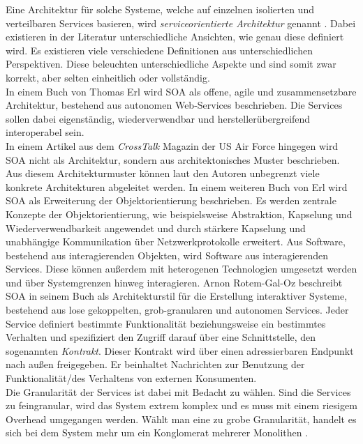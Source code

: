 Eine Architektur für solche Systeme, welche auf einzelnen isolierten und verteilbaren Services basieren, wird \textit{serviceorientierte Architektur} genannt \cite{SANDERS.2008}. Dabei existieren in der Literatur unterschiedliche Ansichten, wie genau diese definiert wird. Es existieren viele verschiedene Definitionen aus unterschiedlichen Perspektiven. Diese beleuchten unterschiedliche Aspekte und sind somit zwar korrekt, aber selten einheitlich oder vollständig.\\ 
In einem Buch von Thomas Erl \cite{ERL.2009} wird SOA als offene, agile und zusammensetzbare Architektur, bestehend aus autonomen Web-Services beschrieben. Die Services sollen dabei eigenständig, wiederverwendbar und herstellerübergreifend interoperabel sein.\\
In einem Artikel aus dem \textit{CrossTalk} Magazin der US Air Force \cite{G.A.LEWIS.2007} hingegen wird SOA nicht als Architektur, sondern aus architektonisches Muster beschrieben. Aus diesem Architekturmuster können laut den Autoren unbegrenzt viele konkrete Architekturen abgeleitet werden.
In einem weiteren Buch von Erl \cite{ERL.2009b} wird SOA als Erweiterung der Objektorientierung beschrieben. Es werden zentrale Konzepte der Objektorientierung, wie beispielsweise Abstraktion, Kapselung und Wiederverwendbarkeit angewendet und durch stärkere Kapselung und unabhängige Kommunikation über Netzwerkprotokolle erweitert. Aus Software, bestehend aus interagierenden Objekten, wird Software aus interagierenden Services. Diese können außerdem mit heterogenen Technologien umgesetzt werden und über Systemgrenzen hinweg interagieren.
Arnon Rotem-Gal-Oz beschreibt SOA in seinem Buch \cite{ROTEMGALOZ.2012} als Architekturstil für die Erstellung interaktiver Systeme, bestehend aus lose gekoppelten, grob-granularen und autonomen Services. Jeder Service definiert bestimmte Funktionalität beziehungsweise ein bestimmtes Verhalten und spezifiziert den Zugriff darauf über eine Schnittstelle, den sogenannten \textit{Kontrakt}. Dieser Kontrakt wird über einen adressierbaren Endpunkt nach außen freigegeben. Er beinhaltet Nachrichten zur Benutzung der Funktionalität/des Verhaltens von externen Konsumenten.\\
Die Granularität der Services ist dabei mit Bedacht zu wählen. Sind die Services zu feingranular, wird das System extrem komplex und es muss mit einem riesigem Overhead umgegangen werden. Wählt man eine zu grobe Granularität, handelt es sich bei dem System mehr um ein Konglomerat mehrerer Monolithen \cite{STORZ.2021}.\\

